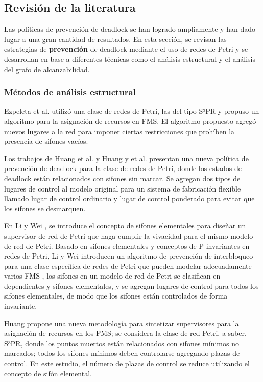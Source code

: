 \subsection{Revisión de la literatura}
Las políticas de prevención de deadlock se han logrado ampliamente y han dado lugar a una gran cantidad de resultados. En esta sección, se revisan las estrategias de \textbf{prevención} de deadlock mediante el uso de redes de Petri y se desarrollan en base a diferentes técnicas como el análisis estructural y el análisis del grafo de alcanzabilidad.

\subsubsection{Métodos de análisis estructural}
Ezpeleta et al. \cite{paperezpeleta} utilizó una clase de redes de Petri, las del tipo S³PR y propuso un algoritmo para la asignación de recursos en FMS. El algoritmo propuesto agregó nuevos lugares a la red para imponer ciertas restricciones que prohíben la presencia de sifones vacíos.

Los trabajos de Huang et al. \cite{YiShengBook} y Huang y et al. \cite{YHuangandJeng} presentan una nueva política de prevención de deadlock para la clase de redes de Petri, donde los estados de deadlock están relacionados con sifones sin marcar. Se agregan dos tipos de lugares de control al modelo original para un sistema de fabricación flexible llamado lugar de control ordinario y lugar de control ponderado para evitar que los sifones se desmarquen.

En Li y Wei \cite{LiandWei} , se introduce el concepto de sifones elementales para diseñar un supervisor de red de Petri que haga cumplir la vivacidad para el mismo modelo de red de Petri. Basado en sifones elementales y conceptos de P-invariantes en redes de Petri, Li y Wei introducen un algoritmo de prevención de interbloqueo para una clase específica de redes de Petri que pueden modelar adecuadamente varios FMS \cite{LiandWei}, los sifones en un modelo de red de Petri se clasifican en dependientes y sifones elementales, y se agregan lugares de control para todos los sifones elementales, de modo que los sifones están controlados de forma invariante.

Huang \cite{Huang2007} propone una nueva metodología para sintetizar supervisores para la asignación de recursos en los FMS; se considera la clase de red Petri, a saber, S³PR, donde los puntos muertos están relacionados con sifones mínimos no marcados; todos los sifones mínimos deben controlarse agregando plazas de control. En este estudio, el número de plazas de control se reduce utilizando el concepto de sifón elemental.

